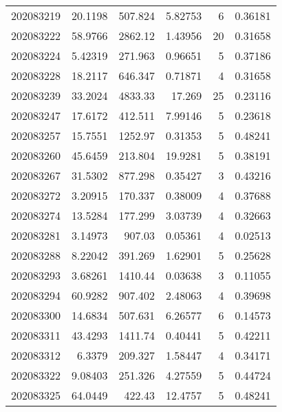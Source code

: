 \begin{tabular}{rrrrrr}
 202083219 &         20.1198  &      507.824  &            5.82753 &           6 & 0.36181 \\
 202083222 &         58.9766  &     2862.12   &            1.43956 &          20 & 0.31658 \\
 202083224 &          5.42319 &      271.963  &            0.96651 &           5 & 0.37186 \\
 202083228 &         18.2117  &      646.347  &            0.71871 &           4 & 0.31658 \\
 202083239 &         33.2024  &     4833.33   &           17.269   &          25 & 0.23116 \\
 202083247 &         17.6172  &      412.511  &            7.99146 &           5 & 0.23618 \\
 202083257 &         15.7551  &     1252.97   &            0.31353 &           5 & 0.48241 \\
 202083260 &         45.6459  &      213.804  &           19.9281  &           5 & 0.38191 \\
 202083267 &         31.5302  &      877.298  &            0.35427 &           3 & 0.43216 \\
 202083272 &          3.20915 &      170.337  &            0.38009 &           4 & 0.37688 \\
 202083274 &         13.5284  &      177.299  &            3.03739 &           4 & 0.32663 \\
 202083281 &          3.14973 &      907.03   &            0.05361 &           4 & 0.02513 \\
 202083288 &          8.22042 &      391.269  &            1.62901 &           5 & 0.25628 \\
 202083293 &          3.68261 &     1410.44   &            0.03638 &           3 & 0.11055 \\
 202083294 &         60.9282  &      907.402  &            2.48063 &           4 & 0.39698 \\
 202083300 &         14.6834  &      507.631  &            6.26577 &           6 & 0.14573 \\
 202083311 &         43.4293  &     1411.74   &            0.40441 &           5 & 0.42211 \\
 202083312 &          6.3379  &      209.327  &            1.58447 &           4 & 0.34171 \\
 202083322 &          9.08403 &      251.326  &            4.27559 &           5 & 0.44724 \\
 202083325 &         64.0449  &      422.43   &           12.4757  &           5 & 0.48241 \\

\end{tabular}
